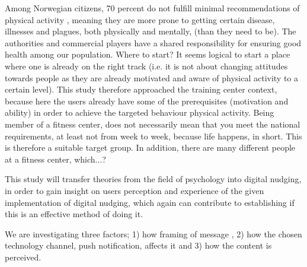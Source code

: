 Among Norwegian citizens, 70 percent do not fulfill minimal recommendations of physical activity \cite{folkehelseinstituttet_fysisk_nodate}, meaning they are more prone to getting certain disease, illnesses and plagues, both physically and mentally, (than they need to be). The authorities and commercial players have a shared responsibility for ensuring good health among our population. Where to start? It seems logical to start a place where one is already on the right track (i.e. it is not about changing attitudes towards people as they are already motivated and aware of physical activity to a certain level). This study therefore approached the training center context, because here the users already have some of the prerequisites (motivation and ability) in order to achieve the targeted behaviour physical activity. Being member of a fitness center, does not necessarily mean that you meet the national requirements, at least not from week to week, because life happens, in short. This is therefore a suitable target group. In addition, there are many different people at a fitness center, which...?


This study will transfer theories from the field of psychology into digital nudging, in order to gain insight on users perception and experience of the given implementation of digital nudging, which again can contribute to establishing if this is an effective method of doing it. 

We are investigating three factors; 1) how framing of message , 2) how the chosen technology channel, push notification, affects it and 3) how the content is perceived.  



